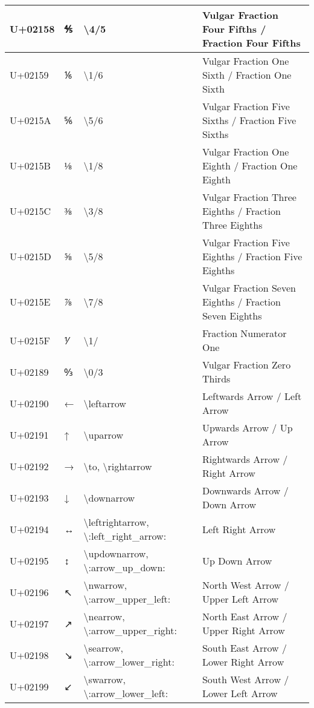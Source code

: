 \begin{table}[h]
\begin{tabulary}{\linewidth}{|L|L|L|L|}
\hline
U+02158 & ⅘ & {\textbackslash}4/5 & Vulgar Fraction Four Fifths / Fraction Four Fifths \\
\hline
U+02159 & ⅙ & {\textbackslash}1/6 & Vulgar Fraction One Sixth / Fraction One Sixth \\
\hline
U+0215A & ⅚ & {\textbackslash}5/6 & Vulgar Fraction Five Sixths / Fraction Five Sixths \\
\hline
U+0215B & ⅛ & {\textbackslash}1/8 & Vulgar Fraction One Eighth / Fraction One Eighth \\
\hline
U+0215C & ⅜ & {\textbackslash}3/8 & Vulgar Fraction Three Eighths / Fraction Three Eighths \\
\hline
U+0215D & ⅝ & {\textbackslash}5/8 & Vulgar Fraction Five Eighths / Fraction Five Eighths \\
\hline
U+0215E & ⅞ & {\textbackslash}7/8 & Vulgar Fraction Seven Eighths / Fraction Seven Eighths \\
\hline
U+0215F & ⅟ & {\textbackslash}1/ & Fraction Numerator One \\
\hline
U+02189 & ↉ & {\textbackslash}0/3 & Vulgar Fraction Zero Thirds \\
\hline
U+02190 & ← & {\textbackslash}leftarrow & Leftwards Arrow / Left Arrow \\
\hline
U+02191 & ↑ & {\textbackslash}uparrow & Upwards Arrow / Up Arrow \\
\hline
U+02192 & → & {\textbackslash}to, {\textbackslash}rightarrow & Rightwards Arrow / Right Arrow \\
\hline
U+02193 & ↓ & {\textbackslash}downarrow & Downwards Arrow / Down Arrow \\
\hline
U+02194 & ↔ & {\textbackslash}leftrightarrow, {\textbackslash}:left\_right\_arrow: & Left Right Arrow \\
\hline
U+02195 & ↕ & {\textbackslash}updownarrow, {\textbackslash}:arrow\_up\_down: & Up Down Arrow \\
\hline
U+02196 & ↖ & {\textbackslash}nwarrow, {\textbackslash}:arrow\_upper\_left: & North West Arrow / Upper Left Arrow \\
\hline
U+02197 & ↗ & {\textbackslash}nearrow, {\textbackslash}:arrow\_upper\_right: & North East Arrow / Upper Right Arrow \\
\hline
U+02198 & ↘ & {\textbackslash}searrow, {\textbackslash}:arrow\_lower\_right: & South East Arrow / Lower Right Arrow \\
\hline
U+02199 & ↙ & {\textbackslash}swarrow, {\textbackslash}:arrow\_lower\_left: & South West Arrow / Lower Left Arrow \\

\end{tabulary}
\end{table}
